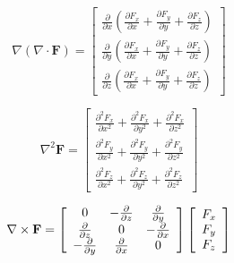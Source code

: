 \documentclass[a4paper,10pt]{book}
\begin{document}
    \begin{equation}
    \nabla\left(\nabla\cdot\mathbf{F}\right)=
        \left[
            \begin{array}{c}
                \frac{\partial}{\partial{x}}\left(\frac{\partial{F_x}}{\partial{x}}+\frac{\partial{F_y}}{\partial{y}}+\frac{\partial{F_z}}{\partial{z}}\right) \\
                \frac{\partial}{\partial{y}}\left(\frac{\partial{F_x}}{\partial{x}}+\frac{\partial{F_y}}{\partial{y}}+\frac{\partial{F_z}}{\partial{z}}\right) \\
                \frac{\partial}{\partial{z}}\left(\frac{\partial{F_x}}{\partial{x}}+\frac{\partial{F_y}}{\partial{y}}+\frac{\partial{F_z}}{\partial{z}}\right)
            \end{array}
        \right]
    \end{equation}

    \begin{equation}
    \nabla^2\mathbf{F}=
        \left[
            \begin{array}{c}
                \frac{\partial^2{F_x}}{\partial{x^2}}+\frac{\partial^2{F_x}}{\partial{y^2}}+\frac{\partial^2{F_x}}{\partial{z^2}} \\
                \frac{\partial^2{F_y}}{\partial{x^2}}+\frac{\partial^2{F_y}}{\partial{y^2}}+\frac{\partial^2{F_y}}{\partial{z^2}} \\
                \frac{\partial^2{F_z}}{\partial{x^2}}+\frac{\partial^2{F_z}}{\partial{y^2}}+\frac{\partial^2{F_z}}{\partial{z^2}}
            \end{array}
        \right]
    \end{equation}

    \begin{equation}
    \nabla\times\mathbf{F}=
        \left[
            \begin{array}{c c c}
                0 & -\frac{\partial}{\partial{z}} & \frac{\partial}{\partial{y}} \\
                \frac{\partial}{\partial{z}} & 0 & -\frac{\partial}{\partial{x}} \\
                -\frac{\partial}{\partial{y}} & \frac{\partial}{\partial{x}} & 0
            \end{array}
        \right]
        \left[
            \begin{array}{c}
                F_x \\ F_y \\ F_z
            \end{array}
        \right]
    \end{equation}
\end{document}
